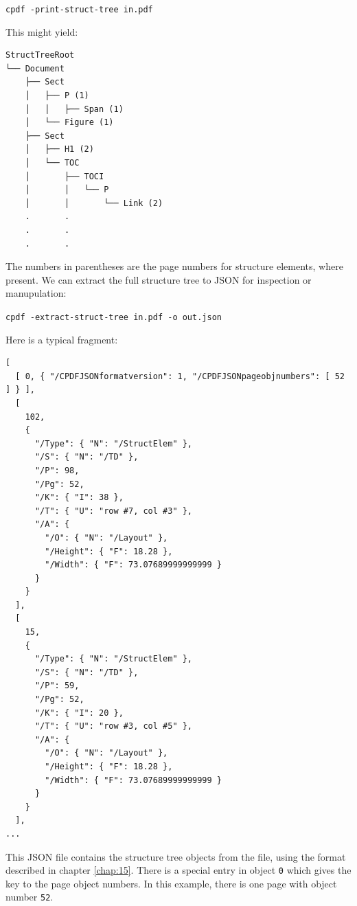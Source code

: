 \documentclass{book}
\newcommand{\smallgap}{\bigskip}
\begin{document}
  \begin{framed}
    \noindent\small\verb!cpdf -print-struct-tree in.pdf!
  \end{framed}

\noindent This might yield:

\begin{minipage}{\linewidth}
\begin{framed}
\begin{verbatim}
StructTreeRoot
└── Document
    ├── Sect
    │   ├── P (1)
    │   │   ├── Span (1)
    │   └── Figure (1)
    ├── Sect
    │   ├── H1 (2)
    │   └── TOC
    │       ├── TOCI
    │       │   └── P
    │       │       └── Link (2)
    .       .
    .       .
    .       .
\end{verbatim}
\end{framed}
\end{minipage}

\smallgap 
\noindent The numbers in parentheses are the page numbers for structure elements, where present. We can extract the full structure tree to JSON for inspection or manupulation:

  \begin{framed}
    \noindent\small\verb!cpdf -extract-struct-tree in.pdf -o out.json!
  \end{framed}

\noindent Here is a typical fragment:

{\small\begin{verbatim}
[
  [ 0, { "/CPDFJSONformatversion": 1, "/CPDFJSONpageobjnumbers": [ 52 ] } ],
  [
    102,
    {
      "/Type": { "N": "/StructElem" },
      "/S": { "N": "/TD" },
      "/P": 98,
      "/Pg": 52,
      "/K": { "I": 38 },
      "/T": { "U": "row #7, col #3" },
      "/A": {
        "/O": { "N": "/Layout" },
        "/Height": { "F": 18.28 },
        "/Width": { "F": 73.07689999999999 }
      }
    }
  ],
  [
    15,
    {
      "/Type": { "N": "/StructElem" },
      "/S": { "N": "/TD" },
      "/P": 59,
      "/Pg": 52,
      "/K": { "I": 20 },
      "/T": { "U": "row #3, col #5" },
      "/A": {
        "/O": { "N": "/Layout" },
        "/Height": { "F": 18.28 },
        "/Width": { "F": 73.07689999999999 }
      }
    }
  ],
...
\end{verbatim}}

\noindent This JSON file contains the structure tree objects from the file, using the format described in chapter \ref{chap:15}. There is a special entry in object \texttt{0} which gives the key to the page object numbers. In this example, there is one page with object number \texttt{52}.
\end{document}
